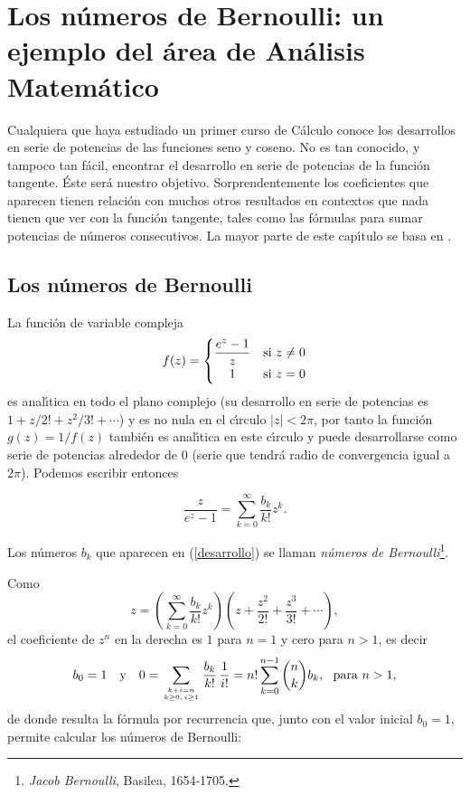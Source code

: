\chapter[Los n\'umeros de Bernoulli: un ejemplo del \'area de An\'alisis]{Los n\'umeros de Bernoulli: un ejemplo del \'area de An\'alisis Matem\'atico}
\label{CapituloBernoulli}

Cualquiera que haya estudiado un primer curso de C\'alculo conoce los desarrollos en serie de potencias de las funciones seno y coseno. No es tan conocido, y tampoco tan f\'acil, encontrar el desarrollo en serie de potencias de la funci\'on tangente. \'Este ser\'a nuestro objetivo. Sorprendentemente los coeficientes que aparecen tienen relaci\'on con muchos otros resultados en contextos que nada tienen que ver con la funci\'on tangente, tales como las f\'ormulas para sumar potencias de n\'umeros consecutivos. La mayor parte de este cap\'\i tulo se basa en \cite[Cap\'\i tulo 27]{Spivak}.

\section{Los n\'umeros de Bernoulli}

La funci\'on de variable compleja $$f(z)=\begin{cases} \displaystyle\frac{e^z-1}{z} & \text{si  } z\not=0\\
\hfill 1\hfill  & \text{si } z=0\end{cases}$$
es anal\'\i tica en todo el plano complejo (su desarrollo en serie de potencias es $1+z/2!+z^2/3!+\cdots$) y es no nula en el c\'\i rculo $|z|<2\pi$, por tanto la funci\'on $g(z)=1/f(z)$ tambi\'en es anal\'\i tica en este c\'\i rculo y puede desarrollarse como serie de potencias alrededor de $0$ (serie que tendr\'a radio de convergencia igual a $2\pi$). Podemos escribir entonces

\begin{equation}
\label{desarrollo}
\frac{z}{e^z-1}=\sum_{k=0}^\infty \frac{b_k}{k!}z^k.
\end{equation}

\begin{definition} Los n\'umeros $b_k$ que aparecen en (\ref{desarrollo}) se llaman \emph{n\'umeros de Bernoulli}\footnote{\emph{Jacob Bernoulli}, Basilea, 1654-1705.}.
\end{definition}

Como
$$z=\left(\sum_{k=0}^\infty\frac{b_k}{k!}z^k\right)\left(z+\frac{z^2}{2!}+\frac{z^3}{3!}+\cdots \right),$$
el coeficiente de $z^n$ en la derecha es $1$ para $n=1$ y cero para $n>1$,  es decir
$$b_0=1\quad \text{y}\quad  0=\sum_{k+i=n \atop k\geq 0,\,i\geq 1}\frac{b_k}{k!}\,\frac{1}{i!}=n!\sum_{k=0}^{n-1}{n\choose k}b_k,\  \text{ para } n>1,$$ de donde resulta la f\'ormula por recurrencia que, junto con el valor inicial $b_0=1$, permite  calcular los n\'umeros de Bernoulli:

